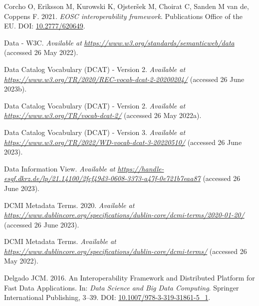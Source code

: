 \begin{CSLReferences}{1}{0}
\leavevmode{}%
Corcho O, Eriksson M, Kurowski K, Ojsteršek M, Choirat C, Sanden M van de, Coppens F. 2021. \emph{EOSC interoperability framework}. Publications Office of the EU. DOI: \href{https://doi.org/10.2777/620649}{10.2777/620649}.

\leavevmode{}%
Data - W3C. \emph{Available at} \href{https://www.w3.org/standards/semanticweb/data}{\emph{https://www.w3.org/standards/semanticweb/data}} (accessed 26 May 2022).

\leavevmode{}%
Data Catalog Vocabulary (DCAT) - Version 2. \emph{Available at} \href{https://www.w3.org/TR/2020/REC-vocab-dcat-2-20200204/}{\emph{https://www.w3.org/TR/2020/REC-vocab-dcat-2-20200204/}} (accessed 26 June 2023b).

\leavevmode{}%
Data Catalog Vocabulary (DCAT) - Version 2. \emph{Available at} \href{https://www.w3.org/TR/vocab-dcat-2/}{\emph{https://www.w3.org/TR/vocab-dcat-2/}} (accessed 26 May 2022a).

\leavevmode{}%
Data Catalog Vocabulary (DCAT) - Version 3. \emph{Available at} \href{https://www.w3.org/TR/2022/WD-vocab-dcat-3-20220510/}{\emph{https://www.w3.org/TR/2022/WD-vocab-dcat-3-20220510/}} (accessed 26 June 2023).

\leavevmode{}%
Data Information View. \emph{Available at} \href{https://handle-esgf.dkrz.de/lp/21.14100/2fcf49d3-0608-3373-a47f-0e721b7eaa87}{\emph{https://handle-esgf.dkrz.de/lp/21.14100/2fcf49d3-0608-3373-a47f-0e721b7eaa87}} (accessed 26 June 2023).

\leavevmode{}%
DCMI Metadata Terms. 2020. \emph{Available at} \href{https://www.dublincore.org/specifications/dublin-core/dcmi-terms/2020-01-20/}{\emph{https://www.dublincore.org/specifications/dublin-core/dcmi-terms/2020-01-20/}} (accessed 26 June 2023).

\leavevmode{}%
DCMI Metadata Terms. \emph{Available at} \href{https://www.dublincore.org/specifications/dublin-core/dcmi-terms/}{\emph{https://www.dublincore.org/specifications/dublin-core/dcmi-terms/}} (accessed 26 May 2022).

\leavevmode{}%
Delgado JCM. 2016. An Interoperability Framework and Distributed Platform for Fast Data Applications. In: \emph{Data Science and Big Data Computing}. Springer International Publishing, 3--39. DOI: \href{https://doi.org/10.1007/978-3-319-31861-5_1}{10.1007/978-3-319-31861-5\_1}.


\end{CSLReferences}
